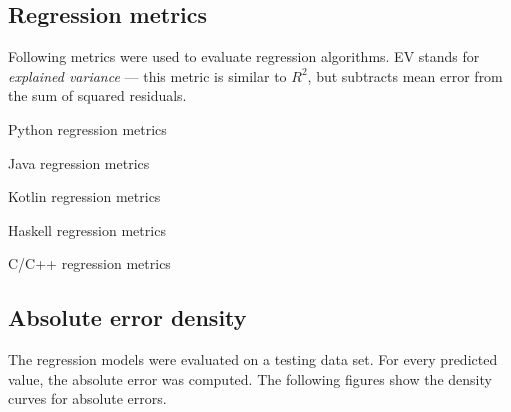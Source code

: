 \documentclass[digital,oneside,oldtable,nolof,nolot,nocover]{fithesis4}
\begin{document}
\FloatBarrier
\subsection*{Regression metrics}
\label{sec:orgcd892e4}
Following metrics were used to evaluate regression algorithms. EV stands for \emph{explained variance}
--- this metric is similar to \(R^2\), but subtracts mean error from the sum of squared residuals.
\begin{table}[H]
\caption{Python regression metrics}
\centering
\begingroup\scriptsize

\endgroup
\end{table}

\begin{table}[H]
\caption{Java regression metrics}
\centering
\begingroup\scriptsize

\endgroup
\end{table}

\begin{table}[H]
\caption{Kotlin regression metrics}
\centering
\begingroup\scriptsize

\endgroup
\end{table}

\begin{table}[H]
\caption{Haskell regression metrics}
\centering
\begingroup\scriptsize

\endgroup
\end{table}

\begin{table}[H]
\caption{C/C++ regression metrics}
\centering
\begingroup\scriptsize

\endgroup
\end{table}

\FloatBarrier
\subsection*{Absolute error density}
\label{sec:org69ad4ca}
The regression models were evaluated on a testing data set. For every predicted value, the absolute error was computed.
The following figures show the density curves for absolute errors.
\FloatBarrier

\restoregeometry

\pagestyle{headings}
\thispagestyle{plain}
\end{document}
